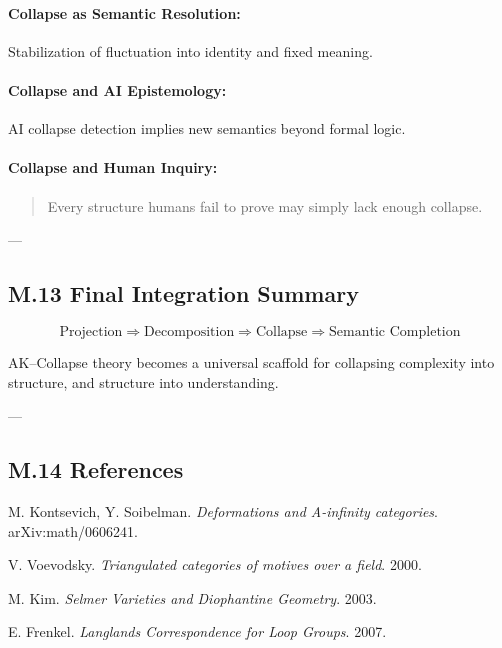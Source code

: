 \documentclass[11pt]{article}
\begin{document}
\begin{axiom}
\begin{axiom}
{{\paragraph{Collapse as Semantic Resolution:}  
Stabilization of fluctuation into identity and fixed meaning.

\paragraph{Collapse and AI Epistemology:}  
AI collapse detection implies new semantics beyond formal logic.

\paragraph{Collapse and Human Inquiry:}  
\begin{quote}
Every structure humans fail to prove may simply lack enough collapse.
\end{quote}

---

\subsection*{M.13 Final Integration Summary}

\[
\text{Projection} \Rightarrow \text{Decomposition} \Rightarrow \text{Collapse} \Rightarrow \text{Semantic Completion}
\]

AK–Collapse theory becomes a universal scaffold for collapsing complexity  
into structure, and structure into understanding.

---

\subsection*{M.14 References}

\begin{thebibliography}{9}

M. Kontsevich, Y. Soibelman.  
\textit{Deformations and A-infinity categories}. arXiv:math/0606241.

V. Voevodsky.  
\textit{Triangulated categories of motives over a field}. 2000.

M. Kim.  
\textit{Selmer Varieties and Diophantine Geometry}. 2003.

E. Frenkel.  
\textit{Langlands Correspondence for Loop Groups}. 2007.


\end{thebibliography}}}
\end{axiom}
\end{axiom}
\end{document}
